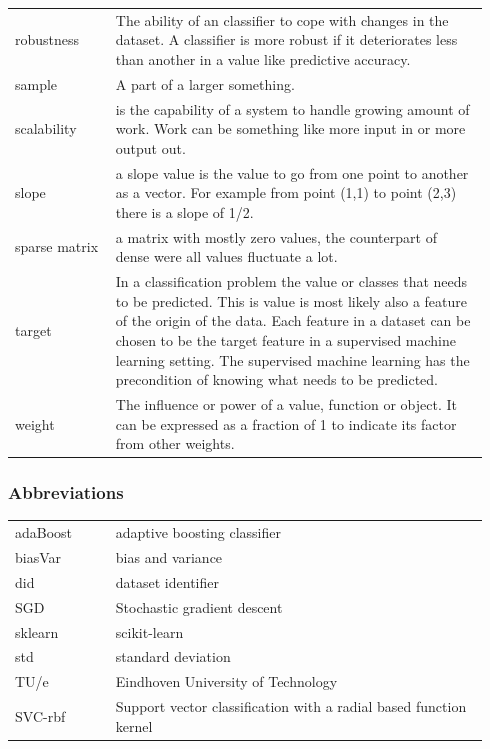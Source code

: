 \documentclass[a4paper,10pt]{article}
\begin{document}
\newpage
\begin{tabular}{ p{0.20\linewidth} p{0.7437\linewidth} }
	
	robustness &  The ability of an classifier to cope with changes in the dataset. A classifier is more robust if it deteriorates less than another in a value like predictive accuracy. \\ [1ex]	
	
	sample & A part of a larger something.\\ [1ex]
	
	scalability & is the capability of a system to handle growing amount of work. Work can be something like more input in or more output out. \\[1ex]	
	
	slope & a slope value is the value to go from one point to another as a vector. For example from point (1,1) to point (2,3) there is a slope of 1/2.\\[1ex]
	
	sparse matrix & a matrix with mostly zero values, the counterpart of dense were all values fluctuate a lot.	\\ [1ex]
	
	target & In a classification problem the value or classes that needs to be predicted. This is value is most likely also a feature of the origin of the data. Each feature in a dataset can be chosen to be the target feature in a supervised machine learning setting. The supervised machine learning has the precondition of knowing what needs to be predicted. \\ [+1ex]	
	
	weight & The influence or power of a value, function or object. It can be expressed as a fraction of 1 to indicate its factor from other weights.	\\ [1ex]	
	\end{tabular}

\subsubsection{Abbreviations}
\begin{tabular}{ p{0.20\linewidth} p{0.7437\linewidth} }
	
	adaBoost & adaptive boosting classifier \\
	
	biasVar & bias and variance \\
	
	did & dataset identifier \\
	
	SGD & Stochastic gradient descent \\
	
	sklearn & scikit-learn \\
	
	std & standard deviation\\
	
	TU/e & Eindhoven University of Technology \\
	
	SVC-rbf & Support vector classification with a radial based function kernel
	
	
\end{tabular}
\end{document}
